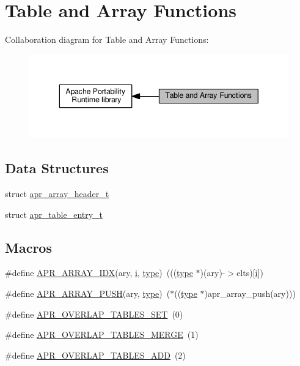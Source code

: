 \hypertarget{group__apr__tables}{}\section{Table and Array Functions}
\label{group__apr__tables}
Collaboration diagram for Table and Array Functions\+:
\nopagebreak
\begin{figure}[H]
\begin{center}
\leavevmode
\includegraphics[width=343pt]{group__apr__tables}
\end{center}
\end{figure}
\subsection*{Data Structures}
\begin{DoxyCompactItemize}
\item 
struct \hyperlink{structapr__array__header__t}{apr\+\_\+array\+\_\+header\+\_\+t}
\item 
struct \hyperlink{structapr__table__entry__t}{apr\+\_\+table\+\_\+entry\+\_\+t}
\end{DoxyCompactItemize}
\subsection*{Macros}
\begin{DoxyCompactItemize}
\item 
\#define \hyperlink{group__apr__tables_ga84066caaa4c7632671af18c229809fc4}{A\+P\+R\+\_\+\+A\+R\+R\+A\+Y\+\_\+\+I\+DX}(ary,  \hyperlink{group__MOD__PROXY_ga38403a0592eb8018a3ad61aef0f7ca2c}{i},  \hyperlink{pcre_8txt_a2463fbbe8b0c90b90db12195e1edaa5d}{type})~(((\hyperlink{pcre_8txt_a2463fbbe8b0c90b90db12195e1edaa5d}{type} $\ast$)(ary)-\/$>$elts)\mbox{[}\hyperlink{group__MOD__PROXY_ga38403a0592eb8018a3ad61aef0f7ca2c}{i}\mbox{]})
\item 
\#define \hyperlink{group__apr__tables_ga1833b0f940ec03d0b95926812152e1ca}{A\+P\+R\+\_\+\+A\+R\+R\+A\+Y\+\_\+\+P\+U\+SH}(ary,  \hyperlink{pcre_8txt_a2463fbbe8b0c90b90db12195e1edaa5d}{type})~($\ast$((\hyperlink{pcre_8txt_a2463fbbe8b0c90b90db12195e1edaa5d}{type} $\ast$)apr\+\_\+array\+\_\+push(ary)))
\item 
\#define \hyperlink{group__apr__tables_ga867455bb7008872e03b08c0742f9698c}{A\+P\+R\+\_\+\+O\+V\+E\+R\+L\+A\+P\+\_\+\+T\+A\+B\+L\+E\+S\+\_\+\+S\+ET}~(0)
\item 
\#define \hyperlink{group__apr__tables_ga553eea6eb6fea4bafaf4cbd7acafdf5f}{A\+P\+R\+\_\+\+O\+V\+E\+R\+L\+A\+P\+\_\+\+T\+A\+B\+L\+E\+S\+\_\+\+M\+E\+R\+GE}~(1)
\item 
\#define \hyperlink{group__apr__tables_gaeb34b58105a0ca1a6c4098de0e38bae2}{A\+P\+R\+\_\+\+O\+V\+E\+R\+L\+A\+P\+\_\+\+T\+A\+B\+L\+E\+S\+\_\+\+A\+DD}~(2)
\end{DoxyCompactItemize}
